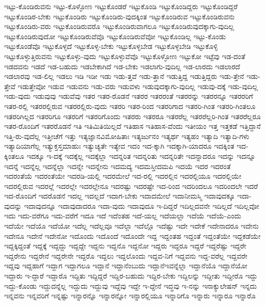 {ಇಟ್ಟು-ಕೊಂಡಿರುವನು
ಇಟ್ಟು-ಕೊಳ್ಳೋಣ
ಇಟ್ಟುಕೊಂಡರೆ
ಇಟ್ಟುಕೊಂಡಿ
ಇಟ್ಟುಕೊಂಡಿದ್ದರು
ಇಟ್ಟುಕೊಂಡಿದ್ದರೆ
ಇಟ್ಟುಕೊಂಡಿರ-ಬೇಕು
ಇಟ್ಟುಕೊಂಡಿರು
ಇಟ್ಟುಕೊಂಡಿರು-ವುದಕ್ಕಿಂತ
ಇಟ್ಟುಕೊಂಡಿರುವ
ಇಟ್ಟುಕೊಂಡಿರುವನು
ಇಟ್ಟುಕೊಂಡಿರು-ವರು
ಇಟ್ಟುಕೊಂಡಿರುವರೊ
ಇಟ್ಟುಕೊಂಡಿರುವಾಗಲೂ
ಇಟ್ಟುಕೊಂಡಿರುವುದಕ್ಕಾಗು-ವುದಿಲ್ಲ
ಇಟ್ಟುಕೊಂಡಿರುವುದೋ
ಇಟ್ಟುಕೊಂಡಿರುವೆವೊ
ಇಟ್ಟುಕೊಂಡಿರುವೆವೋ
ಇಟ್ಟುಕೊಂಡಿಲ್ಲ
ಇಟ್ಟು-ಕೊಂಡು
ಇಟ್ಟುಕೊಂಡೆವೊ
ಇಟ್ಟುಕೊಳ್ಳದೆ
ಇಟ್ಟುಕೊಳ್ಳ-ಬೇಕು
ಇಟ್ಟುಕೊಳ್ಳಬೇಡ
ಇಟ್ಟುಕೊಳ್ಳಬೇಡಿ
ಇಟ್ಟುಕೊಳ್ಳಿ
ಇಟ್ಟುಕೊಳ್ಳುತ್ತಿರುವನು
ಇಟ್ಟುಕೊಳ್ಳು-ವುದು
ಇಟ್ಟುಕೊಳ್ಳುವೆವೊ
ಇಟ್ಟುಕೊಳ್ಳೋಣ
ಇಟ್ಟುಕೋ
ಇಟ್ಟೆವು
ಇಡ-ದಂತೆ
ಇಡದವನು
ಇಡದೆ
ಇಡ-ಬಹುದು
ಇಡಬೇಕಾಗಿದೆ
ಇಡ-ಬೇಕು
ಇಡಲಾಗು-ವುದಿಲ್ಲ
ಇಡ-ಲಾರದು
ಇಡಲಾರದೆ
ಇಡಲಾರವು
ಇಡ-ಲಿಲ್ಲ
ಇಡಲು
ಇಡಿ
ಇಡೀ
ಇಡು
ಇಡು-ತ್ತವೆ
ಇಡು-ತ್ತಾನೆ
ಇಡುತ್ತಿದ್ದ
ಇಡುತ್ತಿದ್ದರು
ಇಡು-ತ್ತೇನೆ
ಇಡು-ತ್ತೇವೆ
ಇಡುತ್ತೇವೋ
ಇಡುವ
ಇಡುವನು
ಇಡು-ವರು
ಇಡುವಳು
ಇಡುವುದಕ್ಕಾಗು-ವುದಿಲ್ಲ
ಇಡುವು-ದಕ್ಕೆ
ಇಡು-ವುದಿಲ್ಲ
ಇಡು-ವುದು
ಇಡುವುವು
ಇಡುವೆವು
ಇತರ
ಇತರ-ರೊಡನೆ
ಇತರರ
ಇತರರಂತೆ
ಇತರರನ್ನು
ಇತರರನ್ನೂ
ಇತರರರಿಗೆ
ಇತರ-ರಲ್ಲಿ
ಇತರರಲ್ಲಿರುವ
ಇತರರಲ್ಲಿರು-ವುದು
ಇತರರಿ
ಇತರ-ರಿಂದ
ಇತರರಿಗಾದ
ಇತರರಿ-ಗಿಂತ
ಇತರರಿ-ಗಿಂತಲೂ
ಇತರರಿಗಿಲ್ಲದ
ಇತರರಿಗೂ
ಇತರರಿಗೆ
ಇತರರಿಗೊಂದು
ಇತರರು
ಇತರರೂ
ಇತರರೆಲ್ಲ
ಇತರರೆಲ್ಲರಿ-ಗಿಂತ
ಇತರರೆಲ್ಲರೂ
ಇತರ-ರೊಂದಿಗೆ
ಇತರರೊಡನೆ
ಇತಿ
ಇತಿಮಿತಿಯಿಲ್ಲದೆ
ಇತಿಹಾಸ
ಇತಿಹಾಸ-ವೆಂದು
ಇತೀಯಂ
ಇತ್ತ
ಇತ್ತಕಡೆ
ಇತ್ತಿದ್ದಾನೆ
ಇತ್ತಿ-ರು-ವುದೆಲ್ಲ
ಇತ್ತೀಚೆಗೆ
ಇತ್ತು
ಇತ್ಯಜ್ಞಾನವಿಮೋಹಿತಾಃ
ಇತ್ಯರ್ಜುನಂ
ಇತ್ಯರ್ಥ
ಇತ್ಯಹಂ
ಇತ್ಯಾದಿ
ಇತ್ಯಾದಿ-ಗಳು
ಇತ್ಯಾದಿಯಾಗೆಲ್ಲ
ಇತ್ಯುಕ್ತಸ್ತಮಾಹುಃ
ಇತ್ಯುಚ್ಯತೇ
ಇತ್ಯೇವ
ಇದಂ
ಇದ-ಕ್ಕಾಗಿ
ಇದಕ್ಕಾಗಿ-ಯಾದರೂ
ಇದಕ್ಕಿಂತ
ಇದ-ಕ್ಕಿಂತಲೂ
ಇದಕ್ಕೂ
ಇ-ದಕ್ಕೆ
ಇದಕ್ಕೆಲ್ಲ
ಇದಕ್ಕೆಲ್ಲಾ
ಇದನ್ನರಿತ
ಇದನ್ನರಿತು
ಇದನ್ನರಿತೇ
ಇದನ್ನಾದರೂ
ಇದನ್ನು
ಇದನ್ನೂ
ಇದನ್ನೆ
ಇದನ್ನೆಲ್ಲ
ಇದನ್ನೆಲ್ಲಾ
ಇದನ್ನೇ
ಇದನ್ನೇನು
ಇದಮದ್ಯ
ಇದಮಸ್ತೀದಮಪಿ
ಇದಯೆ
ಇದರ
ಇದರಂತೆ
ಇದರಂತೆಯೆ
ಇದರಂತೆಯೇ
ಇದರಡಿ-ಯಲ್ಲಿ
ಇದರಮೇಲೆ
ಇದ-ರಲ್ಲಿ
ಇದರಲ್ಲಿನ
ಇದರಲ್ಲಿಯೂ
ಇದರಲ್ಲಿಯೇ
ಇದರಲ್ಲಿರುವ
ಇದರಲ್ಲೆ
ಇದರಲ್ಲೇ
ಇದರಲ್ಲೇನೂ
ಇದರಷ್ಟು
ಇದರಷ್ಟೇ
ಇದ-ರಿಂದ
ಇದರಿಂದಲೂ
ಇದರಿಂದಲೇ
ಇದರೆ
ಇದ-ರೊಂದಿಗೆ
ಇದರೊಡನೆ
ಇದಲ್ಲ
ಇದಲ್ಲದೆ
ಇದಾಗ-ಬೇಕು
ಇದಾದಮೇಲೆ
ಇದಾನೀಮಸ್ಮಿ
ಇದಾವುದಕ್ಕೂ
ಇದಾ-ವುದನ್ನು
ಇದಾವುದನ್ನೂ
ಇದಾವುದಾದರೂ
ಇದಾ-ವುದು
ಇದಾವುದೂ
ಇ-ದಿದ್ದರೆ
ಇದಿಲ್ಲದವನೇ
ಇದಿಲ್ಲದೆ
ಇದಿಲ್ಲವೋ
ಇದು
ಇದು-ವರೆಗೂ
ಇದು-ವರೆಗೆ
ಇದೂ
ಇದೆ
ಇದೆಂತಹ
ಇದೆ-ಯಲ್ಲ
ಇದೆಯಲ್ಲಾ
ಇದೆಯೆ
ಇದೆಯೆ-ಎಂದು
ಇದೆಯೇ
ಇದೆಯೊ
ಇದೆಯೋ
ಇದೆಲ್ಲ
ಇದೆಲ್ಲವೂ
ಇದೆಲ್ಲಾ
ಇದೆಲ್ಲೊ
ಇದೆಷ್ಟು
ಇದೇ
ಇದೇಕೆ
ಇದೇನಾದರೂ
ಇದೇನು
ಇದೇನೂ
ಇದೇನೆ
ಇದೇನೋ
ಇದೊಂದು
ಇದೊಂದೆ
ಇದೊಂದೇ
ಇದ್ದ
ಇದ್ದಂತಹ
ಇದ್ದಂತೆ
ಇದ್ದಂತೆಯೇ
ಇದ್ದಕಡೆಯೇ
ಇದ್ದಕ್ಕಿದ್ದಂತೆ
ಇದ್ದಕ್ಕೆ
ಇದ್ದದ್ದು
ಇದ್ದದ್ದೇ
ಇದ್ದನು
ಇದ್ದನೊ
ಇದ್ದನೋ
ಇದ್ದರು
ಇದ್ದರೂ
ಇದ್ದರೆ
ಇದ್ದರೆಷ್ಟು
ಇದ್ದರೇ
ಇದ್ದರೇನು
ಇದ್ದರೇನೆ
ಇದ್ದರೇನೇ
ಇದ್ದರೊ
ಇದ್ದಲು
ಇದ್ದಲೊಂದು
ಇದ್ದವ-ನಿಗೆ
ಇದ್ದವನು
ಇದ್ದ-ವರೆಲ್ಲ
ಇದ್ದವರೇ
ಇದ್ದವು
ಇದ್ದಹಾಗೆ
ಇದ್ದಾಗ
ಇದ್ದಾಗಲೂ
ಇದ್ದಾನೆ
ಇದ್ದಾನೆಂಬುದು
ಇದ್ದಾನೆಇವನ್ನೆಲ್ಲಾ
ಇದ್ದಾನೆಯೊ
ಇದ್ದಾನೆಯೋ
ಇದ್ದಾರು
ಇ-ದ್ದಾರೆ
ಇದ್ದಾರೊ
ಇದ್ದಿತು
ಇದ್ದಿದ್ದರೆ
ಇದ್ದಿರ-ಬಹುದು
ಇದ್ದಿರ-ಬೇಕು
ಇದ್ದಿಲನ್ನು
ಇದ್ದೀತು
ಇದ್ದೀರೊ
ಇದ್ದು
ಇದ್ದು-ಕೊಂಡು
ಇದ್ದುದನ್ನೆಲ್ಲ
ಇದ್ದುದು
ಇದ್ದುವು
ಇದ್ದೆವು
ಇದ್ದೇ
ಇ-ದ್ದೇನೆ
ಇದ್ಧವು
ಇ-ನನ್ನು
ಇನಾಕ್ಯುಲೇಷನ್
ಇನ್ನದು
ಇನ್ನವನು
ಇನ್ನವರಿಗೆ
ಇನ್ನಷ್ಟು
ಇನ್ನಾರನ್ನೊ
ಇನ್ನಾರನ್ನೋ
ಇನ್ನಾರಲ್ಲಿಯೂ
ಇನ್ನಾರಿಗೊ
ಇನ್ನಾರು
ಇನ್ನಾರೂ
ಇನ್ನಾರೊ
}
